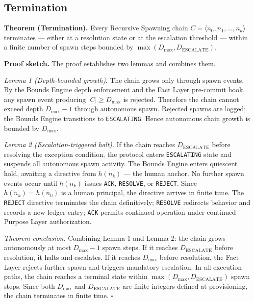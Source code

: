 \subsection{Termination}
\label{sec:rs-termination}

\medskip
\noindent\textbf{Theorem (Termination).} Every Recursive Spawning chain $C = \langle n_0, n_1, \ldots, n_k \rangle$ terminates --- either at a resolution state or at the escalation threshold --- within a finite number of spawn steps bounded by $\max(D_{\mathrm{max}}, D_{\mathrm{ESCALATE}})$.

\medskip
\noindent\textbf{Proof sketch.} The proof establishes two lemmas and combines them.

\medskip
\textit{Lemma 1 (Depth-bounded growth).} The chain grows only through spawn events. By the Bounds Engine depth enforcement and the Fact Layer pre-commit hook, any spawn event producing $|C| \geq D_{\mathrm{max}}$ is rejected. Therefore the chain cannot exceed depth $D_{\mathrm{max}} - 1$ through autonomous spawn. Rejected spawns are logged; the Bounds Engine transitions to \texttt{ESCALATING}. Hence autonomous chain growth is bounded by $D_{\mathrm{max}}$.

\medskip
\textit{Lemma 2 (Escalation-triggered halt).} If the chain reaches $D_{\mathrm{ESCALATE}}$ before resolving the exception condition, the protocol enters \texttt{ESCALATING} state and suspends all autonomous spawn activity. The Bounds Engine enters quiescent hold, awaiting a directive from $h(n_k)$ --- the human anchor. No further spawn events occur until $h(n_k)$ issues \texttt{ACK}, \texttt{RESOLVE}, or \texttt{REJECT}. Since $h(n_k) = h(n_0)$ is a human principal, the directive arrives in finite time. The \texttt{REJECT} directive terminates the chain definitively; \texttt{RESOLVE} redirects behavior and records a new ledger entry; \texttt{ACK} permits continued operation under continued Purpose Layer authorization.

\medskip
\textit{Theorem conclusion.} Combining Lemma 1 and Lemma 2: the chain grows autonomously at most $D_{\mathrm{max}} - 1$ spawn steps. If it reaches $D_{\mathrm{ESCALATE}}$ before resolution, it halts and escalates. If it reaches $D_{\mathrm{max}}$ before resolution, the Fact Layer rejects further spawn and triggers mandatory escalation. In all execution paths, the chain reaches a terminal state within $\max(D_{\mathrm{max}}, D_{\mathrm{ESCALATE}})$ spawn steps. Since both $D_{\mathrm{max}}$ and $D_{\mathrm{ESCALATE}}$ are finite integers defined at provisioning, the chain terminates in finite time. $\square$

